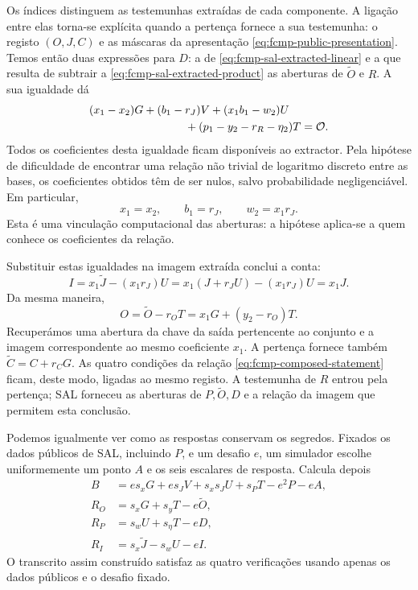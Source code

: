 Os índices distinguem as testemunhas extraídas de cada
componente. A ligação entre elas torna-se explícita quando a
pertença fornece a sua testemunha: o registo \((O,J,C)\) e
as máscaras da apresentação \eqref{eq:fcmp-public-presentation}.
Temos então duas expressões para \(D\): a de
\eqref{eq:fcmp-sal-extracted-linear} e a que resulta de
subtrair a \eqref{eq:fcmp-sal-extracted-product} as aberturas
de \(\widetilde O\) e \(R\). A sua igualdade dá
\begin{equation}
 \begin{aligned}
 &(x_1-x_2)G+(b_1-r_J)V+(x_1b_1-w_2)U\\
 &\hspace{30mm}+(p_1-y_2-r_R-\eta_2)T=\mathcal O.
 \end{aligned}
 \label{eq:fcmp-sal-binding-relation}
\end{equation}
Todos os coeficientes desta igualdade ficam disponíveis ao
extractor. Pela hipótese de dificuldade de encontrar uma
relação não trivial de logaritmo discreto entre as bases,
os coeficientes obtidos têm de ser nulos, salvo probabilidade
negligenciável. Em particular,
\[
 x_1=x_2,\qquad b_1=r_J,\qquad w_2=x_1r_J.
\]
Esta é uma vinculação computacional das aberturas: a hipótese
aplica-se a quem conhece os coeficientes da relação.

Substituir estas igualdades na imagem extraída conclui a conta:
\[
 I=x_1\widetilde J-(x_1r_J)U
   =x_1(J+r_JU)-(x_1r_J)U=x_1J.
\]
Da mesma maneira,
\[
 O=\widetilde O-r_OT=x_1G+(y_2-r_O)T.
\]
Recuperámos uma abertura da chave da saída pertencente ao
conjunto e a imagem correspondente ao mesmo coeficiente
\(x_1\). A pertença fornece também
\(\widetilde C=C+r_CG\). As quatro condições da relação
\eqref{eq:fcmp-composed-statement} ficam, deste modo, ligadas
ao mesmo registo. A testemunha de \(R\) entrou pela pertença;
SAL forneceu as aberturas de \(P,\widetilde O,D\) e a relação
da imagem que permitem esta conclusão.

Podemos igualmente ver como as respostas conservam os segredos.
Fixados os dados públicos de SAL, incluindo \(P\), e um
desafio \(e\), um simulador escolhe uniformemente um ponto
\(A\) e os seis escalares de resposta.
Calcula depois
\[
 \begin{aligned}
 B&=es_xG+es_JV+s_xs_JU+s_PT-e^2P-eA,\\
 R_O&=s_xG+s_yT-e\widetilde O,\\
 R_P&=s_wU+s_\eta T-eD,\\
 R_I&=s_x\widetilde J-s_wU-eI.
 \end{aligned}
\]
O transcrito assim construído satisfaz as quatro verificações
usando apenas os dados públicos e o desafio fixado.

